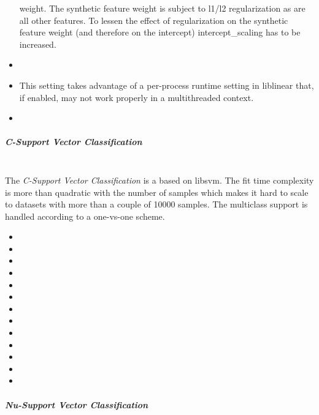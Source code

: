 \begin{itemize}
  weight.
  \nb The synthetic feature weight is subject to l1/l2 regularization as are all
  other features.
  To lessen the effect of regularization on the synthetic feature weight (and
  therefore on the intercept) intercept\_scaling has to be increased.
  \item {}
  \item {}
  \nb This setting takes advantage of a per-process runtime setting in liblinear
  that, if enabled, may not work properly in a multithreaded context.
  \item {}
\end{itemize}

\subparagraph{C-Support Vector Classification}
\mbox{}
\\The \textit{C-Support Vector Classification} is a based on libsvm.
%
The fit time complexity is more than quadratic with the number of samples which
makes it hard to scale to datasets with more than a couple of 10000 samples.
%
The multiclass support is handled according to a one-vs-one scheme.
%
\begin{itemize}
  \item {}
  \item {}
  \item {}
  \item {}
  \item {}
  \item {}
  \item {}
  \item {}
  \item \cacheSizeDescription{}
  \item {}
  \item {}
  \item {}
  \item {}
\end{itemize}

\subparagraph{Nu-Support Vector Classification}
\mbox{}


